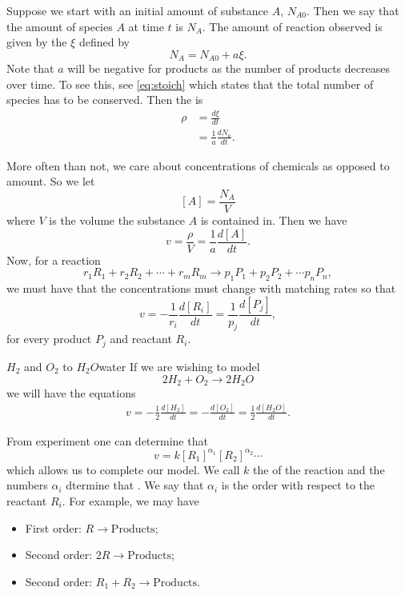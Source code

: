         Suppose we start with an initial amount of substance $A$, $N_{A0}$. Then we say that the amount of species $A$ at time $t$ is $N_{A}$.  The amount of reaction observed is given by the  $\xi$ defined by
        \[
        N_A = N_{A0}+a\xi.
        \]
        Note that $a$ will be negative for products as the number of products decreases over time. To see this, see \ref{eq:stoich} which states that the total number of species has to be conserved. Then the  is 
        \begin{align*}
            \rho &= \frac{d\xi}{dt}\\
            &= \frac{1}{a}\frac{dN_a}{dt}.
        \end{align*}
        
        More often than not, we care about concentrations of chemicals as opposed to amount. So we let
        \[
        [A]=\frac{N_A}{V}
        \]
        where $V$ is the volume the substance $A$ is contained in.  Then we have
        \[
        v=\frac{\rho}{V}=\frac{1}{a}\frac{d[A]}{dt}.
        \]
        Now, for a reaction 
        \[
        r_1R_1 + r_2R_2 + \cdots + r_mR_m \to p_1 P_1 + p_2P_2 +\cdots p_n P_n,
        \]
        we must have that the concentrations must change with matching rates so that
        \[
        v=-\frac{1}{r_i}\frac{d[R_i]}{dt}=\frac{1}{p_j}\frac{d[P_j]}{dt},
        \]
        for every product $P_j$ and reactant $R_i$.
        
        \begin{ex}{$H_2$ and $O_2$ to $H_2O$}{water}
        If we are wishing to model
        \[
        2H_2 + O_2 \to 2H_2O
        \]
        we will have the equations
        \begin{align*}
            v=-\frac{1}{2}\frac{d[H_2]}{dt}=-\frac{d[O_2]}{dt}=\frac{1}{2}\frac{d[H_2O]}{dt}.
        \end{align*}
        \end{ex}
        
        From experiment one can determine that
        \[
        v=k[R_1]^{\alpha_1}[R_2]^{\alpha_2}\cdots
        \]
        which allows us to complete our model.  We call $k$ the  of the reaction and the numbers $\alpha_i$ dtermine that . We say that $\alpha_i$ is the order with respect to the reactant $R_i$. For example, we may have
        \begin{itemize}
            \item First order: $R \to \textrm{Products}$;
            \item Second order: $2R \to \textrm{Products}$;\\
            \item Second order: $R_1+R_2 \to \textrm{Products}$.
        \end{itemize}
        
